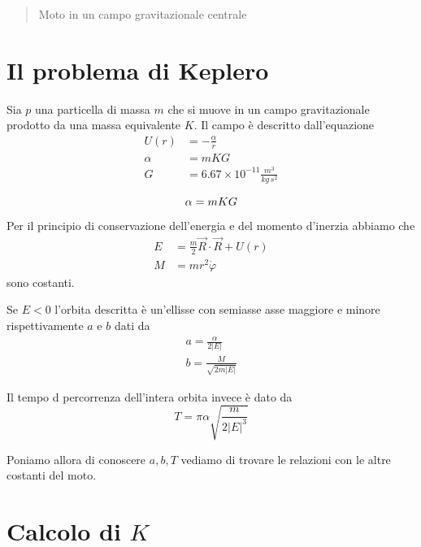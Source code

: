\documentclass[a4paper,11pt]{article}
\title{}
\author{}
\begin{document}
\maketitle

\begin{abstract}
	Moto in un campo gravitazionale centrale
\end{abstract}

\section{Il problema di Keplero}
Sia $ p $ una particella di massa $ m $ che si muove in un campo gravitazionale prodotto da una massa equivalente $ K $.
Il campo è descritto dall'equazione
\begin{align*}
	U(r) & = - \frac{\alpha}{r} \\
	\alpha & = m K G \\
	G & = 6.67 \times 10^{-11} \frac{m^3}{kg \, s^2} \\
\end{align*}
\begin{equation}
 \label{alpha}	\alpha = m K G \\
\end{equation}

Per il principio di conservazione dell'energia e del momento d'inerzia abbiamo che
\begin{align*}
	E & = \frac{m}{2} \vec R \cdot \vec R + U(r)\\
	M & = mr^2\dot \varphi
\end{align*}
sono costanti.

Se $ E < 0 $ l'orbita descritta è un'ellisse con semiasse asse maggiore e minore rispettivamente $ a $ e $ b $ dati da
\begin{eqnarray}
 \label{a}	a  = \frac{\alpha}{2 |E|} \\
 \label{b}  b  = \frac{M}{\sqrt{2 m |E|}}
\end{eqnarray}

Il tempo d percorrenza dell'intera orbita invece è dato da
\begin{equation}
\label{T}	T = \pi \alpha \sqrt{\frac{m}{2|E|^3}}
\end{equation}

Poniamo allora di conoscere $ a , b, T $ vediamo di trovare le relazioni con le altre costanti del moto.

\section{Calcolo di $K$}
\end{document}
